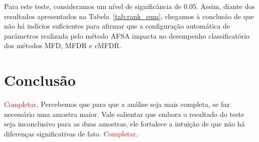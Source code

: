 \documentclass[conference]{IEEEtran}
\begin{document}
Para este teste, consideramos um nível de significância de 0.05. Assim, diante dos resultados apresentados na Tabela~\ref{tab:rank_sum}, chegamos à conclusão de que não há indícios suficientes para afirmar que a configuração automática de parâmetros realizada pelo método AFSA impacta no desempenho classificatório dos métodos MFD, MFDR e cMFDR. 

\section{Conclusão}
\label{sec:conclusao}
\textcolor{red}{Completar.}
Percebemos que para que a análise seja mais completa, se faz necessário uma amostra maior.
Vale salientar que embora o resultado do teste seja inconclusivo para as duas amostras, ele fortalece a intuição de que não há diferenças significativas de fato.
\textcolor{red}{Completar.}



% 

\end{document}

